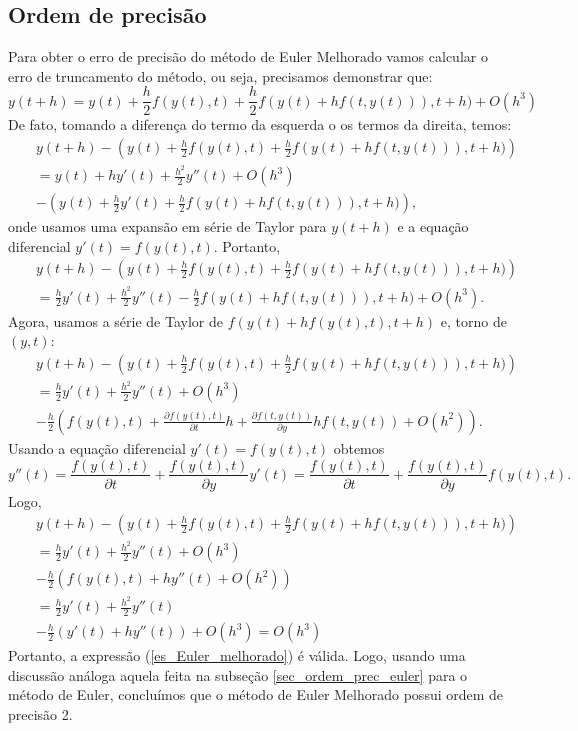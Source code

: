 \subsection{Ordem de precisão}
Para obter o erro de precisão do método de Euler Melhorado vamos calcular o erro de truncamento do método, ou seja, precisamos demonstrar que:
\begin{equation}\label{es_Euler_melhorado}
y(t+h)=y(t)+\frac{h}{2} f(y(t),t)+\frac{h}{2} f(y(t)+hf(t,y(t))),t+h)+O(h^3)
\end{equation}
De fato, tomando a diferença do termo da esquerda o os termos da direita, temos:
\begin{eqnarray*}
&&y(t+h)-\left(y(t)+\frac{h}{2} f(y(t),t)+\frac{h}{2} f(y(t)+hf(t,y(t))),t+h)\right)\\
&&=y(t)+hy'(t)+\frac{h^2}{2}y''(t)+O(h^3)\\
&&-\left(y(t)+\frac{h}{2} y'(t)+\frac{h}{2} f(y(t)+hf(t,y(t))),t+h)\right),
\end{eqnarray*}
onde usamos uma expansão em série de Taylor para $y(t+h)$ e a equação diferencial $y'(t)=f(y(t),t)$. Portanto,
\begin{eqnarray*}
&&y(t+h)-\left(y(t)+\frac{h}{2} f(y(t),t)+\frac{h}{2} f(y(t)+hf(t,y(t))),t+h)\right)\\
&&=\frac{h}{2}y'(t)+\frac{h^2}{2}y''(t)-\frac{h}{2} f(y(t)+hf(t,y(t))),t+h)+O(h^3).
\end{eqnarray*}
Agora, usamos a série de Taylor de $f(y(t)+hf(y(t),t),t+h)$ e, torno de $(y,t)$:
\begin{eqnarray*}
&&y(t+h)-\left(y(t)+\frac{h}{2} f(y(t),t)+\frac{h}{2} f(y(t)+hf(t,y(t))),t+h)\right)\\
&&=\frac{h}{2}y'(t)+\frac{h^2}{2}y''(t)+O(h^3)\\
&&-\frac{h}{2}\left(f(y(t),t)+\frac{\partial f(y(t),t) }{\partial t}h +\frac{\partial f(t,y(t))}{\partial y} hf(t,y(t))+O(h^2)\right).
\end{eqnarray*}
Usando a equação diferencial $y'(t)=f(y(t),t)$ obtemos 
$$
y''(t)=\frac{f(y(t),t)}{\partial t}+\frac{f(y(t),t)}{\partial y}y'(t)=\frac{f(y(t),t)}{\partial t}+\frac{f(y(t),t)}{\partial y}f(y(t),t).
$$
Logo,
\begin{eqnarray*}
&&y(t+h)-\left(y(t)+\frac{h}{2} f(y(t),t)+\frac{h}{2} f(y(t)+hf(t,y(t))),t+h)\right)\\
&&=\frac{h}{2}y'(t)+\frac{h^2}{2}y''(t)+O(h^3)\\
&&-\frac{h}{2}\left(f(y(t),t)+hy''(t)+O(h^2)\right)\\
&&=\frac{h}{2}y'(t)+\frac{h^2}{2}y''(t)\\
&&-\frac{h}{2}\left(y'(t)+hy''(t)\right)+O(h^3)=O(h^3)
\end{eqnarray*}
Portanto, a expressão (\ref{es_Euler_melhorado}) é válida. Logo, usando uma discussão análoga aquela feita na subseção \ref{sec_ordem_prec_euler} para o método de Euler, concluímos que o método de Euler Melhorado possui ordem de precisão 2.


